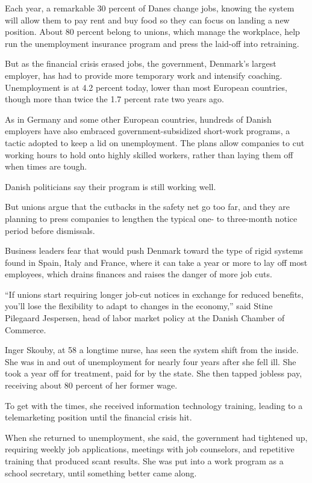 ﻿\documentclass[12pt]{article}
\begin{document}
Each year, a remarkable 30 percent of Danes change jobs, knowing the system will allow them to pay
rent and buy food so they can focus on landing a new position. About 80 percent belong to unions,
which manage the workplace, help run the unemployment insurance program and press the laid-off into
retraining.

But as the financial crisis erased jobs, the government, Denmark's largest employer, has had to
provide more temporary work and intensify coaching. Unemployment is at 4.2 percent today, lower than
most European countries, though more than twice the 1.7 percent rate two years ago.

As in Germany and some other European countries, hundreds of Danish employers have also embraced
government-subsidized short-work programs, a tactic adopted to keep a lid on unemployment. The plans
allow companies to cut working hours to hold onto highly skilled workers, rather than laying them
off when times are tough.

Danish politicians say their program is still working well.

But unions argue that the cutbacks in the safety net go too far, and they are planning to press
companies to lengthen the typical one- to three-month notice period before dismissals.

Business leaders fear that would push Denmark toward the type of rigid systems found in Spain, Italy
and France, where it can take a year or more to lay off most employees, which drains finances and
raises the danger of more job cuts.

``If unions start requiring longer job-cut notices in exchange for reduced benefits, you'll lose the
flexibility to adapt to changes in the economy,'' said Stine Pilegaard Jespersen, head of labor
market policy at the Danish Chamber of Commerce.

Inger Skouby, at 58 a longtime nurse, has seen the system shift from the inside. She was in and out
of unemployment for nearly four years after she fell ill. She took a year off for treatment, paid
for by the state. She then tapped jobless pay, receiving about 80 percent of her former wage.

To get with the times, she received information technology training, leading to a telemarketing
position until the financial crisis hit.

When she returned to unemployment, she said, the government had tightened up, requiring weekly job
applications, meetings with job counselors, and repetitive training that produced scant results. She
was put into a work program as a school secretary, until something better came along.
\end{document}
